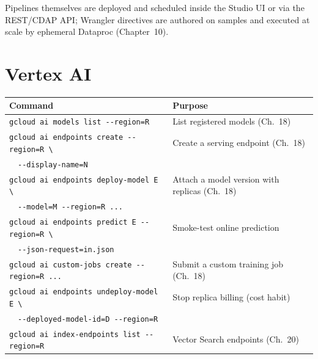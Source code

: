 \noindent Pipelines themselves are deployed and scheduled inside the Studio UI or via the REST/CDAP
API; Wrangler directives are authored on samples and executed at scale by ephemeral Dataproc
(Chapter~10).

\section{Vertex AI}
\begin{center}
\footnotesize
\begin{tabular}{@{}p{6.6cm}p{6.2cm}@{}}
\toprule
\textbf{Command} & \textbf{Purpose} \\
\midrule
\texttt{gcloud ai models list -{}-region=R} & List registered models (Ch.~18) \\
\texttt{gcloud ai endpoints create -{}-region=R \textbackslash} & Create a serving endpoint (Ch.~18) \\
~~\texttt{-{}-display-name=N} & \\
\texttt{gcloud ai endpoints deploy-model E \textbackslash} & Attach a model version with replicas (Ch.~18) \\
~~\texttt{-{}-model=M -{}-region=R ...} & \\
\texttt{gcloud ai endpoints predict E -{}-region=R \textbackslash} & Smoke-test online prediction \\
~~\texttt{-{}-json-request=in.json} & \\
\texttt{gcloud ai custom-jobs create -{}-region=R ...} & Submit a custom training job (Ch.~18) \\
\texttt{gcloud ai endpoints undeploy-model E \textbackslash} & Stop replica billing (cost habit) \\
~~\texttt{-{}-deployed-model-id=D -{}-region=R} & \\
\texttt{gcloud ai index-endpoints list -{}-region=R} & Vector Search endpoints (Ch.~20) \\
\bottomrule
\end{tabular}
\end{center}

